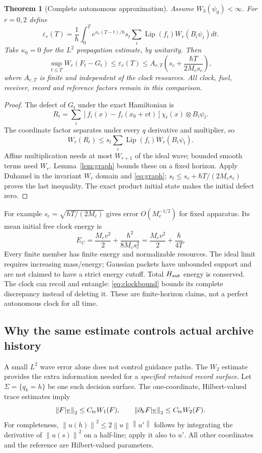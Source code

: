 \documentclass[11pt]{article}
\newtheorem{theorem}{Theorem}[section]
\theoremstyle{definition}\newtheorem{assumption}[theorem]{Constitutive assumption}
\theoremstyle{remark}\newtheorem{remark}[theorem]{Remark}
\newcommand{\norm}[1]{\left\|#1\right\|}\newcommand{\pos}[1]{[#1]_+}
\begin{document}
\begin{theorem}[Complete autonomous approximation]\label{thm:clock}
Assume $W_3(\psi_0)<\infty$. For $r=0,2$ define
\begin{equation}\label{eq:epsclock}
 \varepsilon_r(T)=\frac1\hbar\int_0^T e^{\kappa_r(T-t)/\hbar}s_t
                         \sum_i\operatorname{Lip}(f_i)W_r(B_i\psi_t)dt.
\end{equation}
Take $\kappa_0=0$ for the $L^2$ propagation estimate, by unitarity. Then
\begin{equation}\label{eq:clockbound}
 \sup_{t\le T}W_r(F_t-G_t)\le\varepsilon_r(T)
 \le A_{r,T}\left(s_c+\frac{\hbar T}{2M_cs_c}\right),
\end{equation}
where $A_{r,T}$ is finite and independent of the clock resources. All clock, fuel, receiver, record and reference factors remain in this comparison.
\end{theorem}
\begin{proof}
The defect of $G_t$ under the exact Hamiltonian is
\[
 R_t=\sum_i[f_i(x)-f_i(x_0+vt)]\chi_t(x)\otimes B_i\psi_t.
\]
The coordinate factor separates under every $q$ derivative and multiplier, so
\[
 W_r(R_t)\le s_t\sum_i\operatorname{Lip}(f_i)W_r(B_i\psi_t).
\]
Affine multiplication needs at most $W_{r+1}$ of the ideal wave; bounded smooth terms need $W_r$. Lemma~\ref{lem:graph} bounds these on a fixed horizon. Apply Duhamel in the invariant $W_r$ domain and \eqref{eq:graph}; $s_t\le s_c+\hbar T/(2M_cs_c)$ proves the last inequality. The exact product initial state makes the initial defect zero.
\end{proof}
For example $s_c=\sqrt{\hbar T/(2M_c)}$ gives error $O(M_c^{-1/2})$ for fixed apparatus. Its mean initial free clock energy is
\begin{equation}\label{eq:clockenergy}
 E_C=\frac{M_cv^2}{2}+\frac{\hbar^2}{8M_cs_c^2}
     =\frac{M_cv^2}{2}+\frac{\hbar}{4T}.
\end{equation}
Every finite member has finite energy and normalizable resources. The ideal limit requires increasing mass/energy; Gaussian packets have unbounded support and are not claimed to have a strict energy cutoff. Total $H_{\rm aut}$ energy is conserved. The clock can recoil and entangle: \eqref{eq:clockbound} bounds its complete discrepancy instead of deleting it. These are finite-horizon claims, not a perfect autonomous clock for all time.

\subsection{Why the same estimate controls actual archive history}
A small $L^2$ wave error alone does not control guidance paths. The $W_2$ estimate provides the extra information needed for a \emph{specified retained record surface}. Let $\Sigma=\{q_k=h\}$ be one such decision surface. The one-coordinate, Hilbert-valued trace estimates imply
\[
 \norm{F|_\Sigma}_2\le C_{\rm tr}W_1(F),\qquad
 \norm{\partial_kF|_\Sigma}_2\le C_{\rm tr}W_2(F).
\]
For completeness, $\norm{u(h)}^2\le2\norm u\norm{u'}$ follows by integrating the derivative of $\norm{u(s)}^2$ on a half-line; apply it also to $u'$. All other coordinates and the reference are Hilbert-valued parameters.
\end{document}
